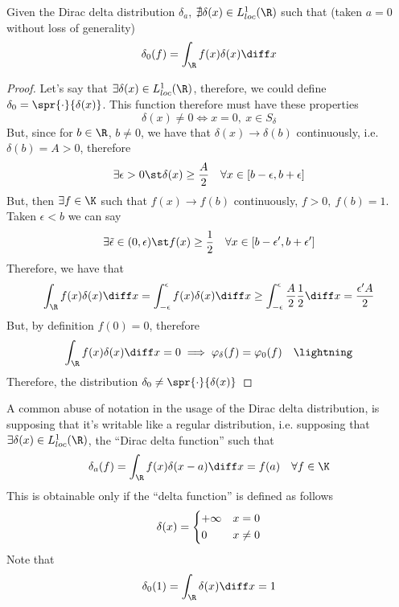 \documentclass[../mmf.tex]{subfiles}
\begin{document}
\begin{thm}
	Given the Dirac delta distribution $\delta_a$, $\nexists\delta(x)\in L^1_{loc}(\R)$ such that (taken $a=0$ without loss of generality)
	\begin{equation*}
		\delta_0(f)=\int_{\R}^{}f(x)\delta(x)\diff x
	\end{equation*}
\end{thm}
\begin{proof}
	Let's say that $\exists\delta(x)\in L^1_{loc}(\R)$, therefore, we could define $\delta_0=\spr{\cdot}{\delta(x)}$. This function therefore must have these properties
	\begin{equation*}
		\delta(x)\ne0\iff x=0,\ x\in S_\delta
	\end{equation*}
	But, since for $b\in\R$, $b\ne0$, we have that $\delta(x)\to\delta(b)$ continuously, i.e. $\delta(b)=A>0$, therefore
	\begin{equation*}
		\exists\epsilon>0\st\delta(x)\ge\frac{A}{2}\quad\forall x\in[b-\epsilon,b+\epsilon]
	\end{equation*}
	But, then $\exists f\in\K$ such that $f(x)\to f(b)$ continuously, $f>0,\ f(b)=1$. Taken $\epsilon<b$ we can say
	\begin{equation*}
		\exists\tilde{\epsilon}\in(0,\epsilon)\st f(x)\ge\frac{1}{2}\quad\forall x\in[b-\epsilon',b+\epsilon']
	\end{equation*}
	Therefore, we have that
	\begin{equation*}
		\int_{\R}^{}f(x)\delta(x)\diff x=\int_{-\epsilon}^{\epsilon}f(x)\delta(x)\diff x\ge\int_{-\epsilon}^{\epsilon}\frac{A}{2}\frac{1}{2}\diff x=\frac{\epsilon'A}{2}
	\end{equation*}
	But, by definition $f(0)=0$, therefore
	\begin{equation*}
		\int_{\R}^{}f(x)\delta(x)\diff x=0\implies{}\varphi_\delta(f)=\varphi_0(f)\quad\lightning
	\end{equation*}
	Therefore, the distribution $\delta_0\ne\spr{\cdot}{\delta(x)}$
\end{proof}
\begin{ntn}
	A common abuse of notation in the usage of the Dirac delta distribution, is supposing that it's writable like a regular distribution, i.e. supposing that $\exists\delta(x)\in L^1_{loc}(\R)$, the ``Dirac delta function'' such that
	\begin{equation*}
		\delta_a(f)=\int_{\R}^{}f(x)\delta(x-a)\diff x=f(a)\quad\forall f\in\K
	\end{equation*}
	This is obtainable only if the ``delta function'' is defined as follows
	\begin{equation}
		\delta(x)=\begin{dcases}
			+\infty&x=0\\
			0&x\ne0
		\end{dcases}
		\label{eq:deltafunction}
	\end{equation}
	Note that
	\begin{equation*}
		\delta_0(1)=\int_{\R}^{}\delta(x)\diff x=1
	\end{equation*}
\end{ntn}
\end{document}
